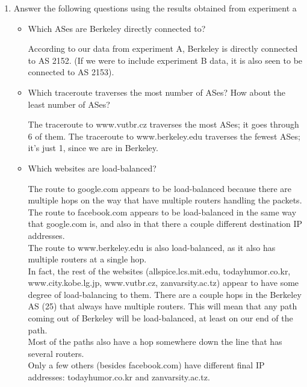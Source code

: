 \documentclass[10pt]{article}
\begin{document}
\begin{enumerate}

\item Answer the following questions using the results obtained from experiment a

\begin{itemize}

\item Which ASes are Berkeley directly connected to?

According to our data from experiment A, Berkeley is directly connected to AS 2152.  (If we were to include experiment B data, it is also seen to be connected to AS 2153).

\item Which traceroute traverses the most number of ASes? How about the least number of ASes?

The traceroute to www.vutbr.cz traverses the most ASes; it goes through 6 of them.  The traceroute to www.berkeley.edu traverses the fewest ASes; it's just 1, since we are in Berkeley.

\item Which websites are load-balanced?

The route to google.com appears to be load-balanced because there are multiple hops on the way that have multiple routers handling the packets. \\

The route to facebook.com appears to be load-balanced in the same way that google.com is, and also in that there a couple different destination IP addresses. \\

The route to www.berkeley.edu is also load-balanced, as it also has multiple routers at a single hop. \\

In fact, the rest of the websites (allspice.lcs.mit.edu, todayhumor.co.kr, www.city.kobe.lg.jp, www.vutbr.cz, zanvarsity.ac.tz) appear to have some degree of load-balancing to them.  There are a couple hops in the Berkeley AS (25) that always have multiple routers.  This will mean that any path coming out of Berkeley will be load-balanced, at least on our end of the path. \\

Most of the paths also have a hop somewhere down the line that has several routers. \\

Only a few others (besides facebook.com) have different final IP addresses: todayhumor.co.kr and zanvarsity.ac.tz.


\end{itemize}
\end{enumerate}
\end{document}
